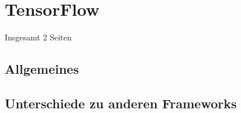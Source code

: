 \chapter{TensorFlow}
\label{chap:tensorflow}
\chapterauthor{\authorNiklas}
Insgesamt 2 Seiten


\section{Allgemeines}
\label{sec:allgemeines}


\section{Unterschiede zu anderen Frameworks}
\label{sec:unterschiede}
